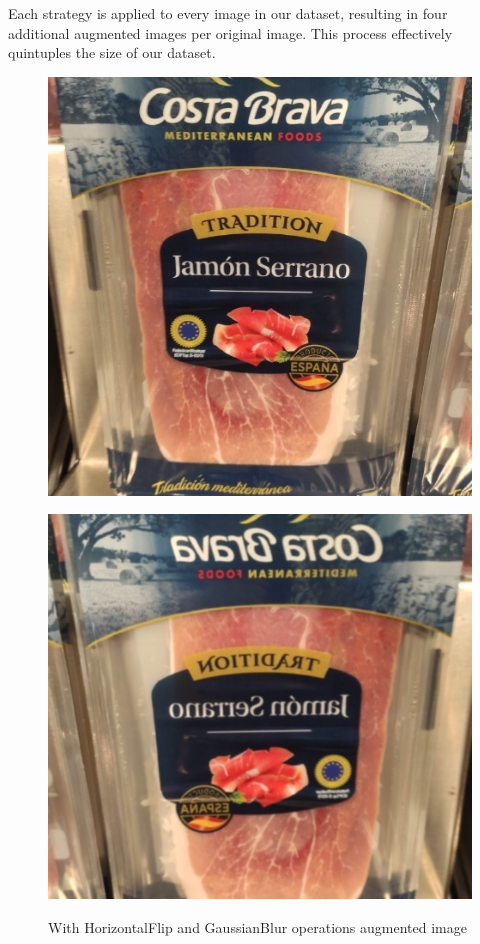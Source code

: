 Each strategy is applied to every image in our dataset, resulting in four additional augmented images per original image. This process effectively quintuples the size of our dataset.
\begin{figure}[ht]
\begin{minipage}{.46\textwidth}
  \centering
  \includegraphics[width=\linewidth]{figures/argutmented_2.jpg}
  \label{fig:costa_brava_original}
\end{minipage}
\begin{minipage}{.5\textwidth}  \centering
  \includegraphics[width=\linewidth]{figures/argumented_1.jpg}
  \label{fig:costa_brava_augmented}
\end{minipage}
\caption{With HorizontalFlip and GaussianBlur operations augmented image}
\label{fig:costa_brava_comparison}
\end{figure}


